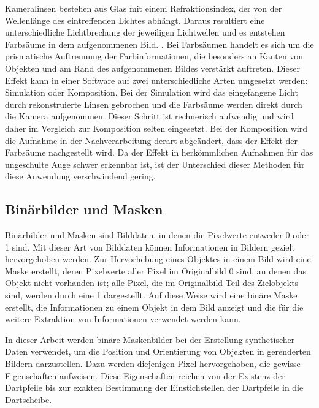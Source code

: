Kameralinsen bestehen aus Glas mit einem Refraktionsindex, der von der Wellenlänge des eintreffenden Lichtes abhängt. Daraus resultiert eine unterschiedliche Lichtbrechung der jeweiligen Lichtwellen und es entstehen Farbsäume in dem aufgenommenen Bild. \cite{lens_distortion, camera_everything}. Bei Farbsäumen handelt es sich um die prismatische Auftrennung der Farbinformationen, die besonders an Kanten von Objekten und am Rand des aufgenommenen Bildes verstärkt auftreten. Dieser Effekt kann in einer Software auf zwei unterschiedliche Arten umgesetzt werden: Simulation oder Komposition. Bei der Simulation wird das eingefangene Licht durch rekonstruierte Linsen gebrochen und die Farbsäume werden direkt durch die Kamera aufgenommen. Dieser Schritt ist rechnerisch aufwendig und wird daher im Vergleich zur Komposition selten eingesetzt. Bei der Komposition wird die Aufnahme in der Nachverarbeitung derart abgeändert, dass der Effekt der Farbsäume nachgestellt wird. Da der Effekt in herkömmlichen Aufnahmen für das ungeschulte Auge schwer erkennbar ist, ist der Unterschied dieser Methoden für diese Anwendung verschwindend gering.


\subsection{Binärbilder und Masken}
\label{sec:masken}

Binärbilder und Masken sind Bilddaten, in denen die Pixelwerte entweder 0 oder 1 sind. Mit dieser Art von Bilddaten können Informationen in Bildern gezielt hervorgehoben werden. Zur Hervorhebung eines Objektes in einem Bild wird eine Maske erstellt, deren Pixelwerte aller Pixel im Originalbild 0 sind, an denen das Objekt nicht vorhanden ist; alle Pixel, die im Originalbild Teil des Zielobjekts sind, werden durch eine 1 dargestellt. Auf diese Weise wird eine binäre Maske erstellt, die Informationen zu einem Objekt in dem Bild anzeigt und die für die weitere Extraktion von Informationen verwendet werden kann.

In dieser Arbeit werden binäre Maskenbilder bei der Erstellung synthetischer Daten verwendet, um die Position und Orientierung von Objekten in gerenderten Bildern darzustellen. Dazu werden diejenigen Pixel hervorgehoben, die gewisse Eigenschaften aufweisen. Diese Eigenschaften reichen von der Existenz der Dartpfeile bis zur exakten Bestimmung der Einstichstellen der Dartpfeile in die Dartscheibe.

